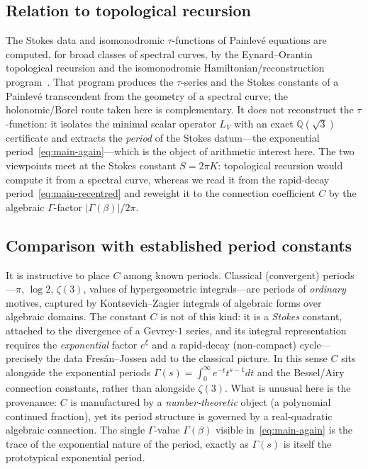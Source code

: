 \documentclass[11pt,reqno]{amsart}
\renewcommand{\_}{\vquadorigunderscore\allowbreak}
\theoremstyle{plain}
\theoremstyle{definition}
\newcommand{\LV}{L_{V}}
\newcommand{\Qsqrt}{\mathbb{Q}(\sqrt3)}
\providecommand{\C}{}\renewcommand{\C}{C}
\begin{document}
\subsection{Relation to topological recursion}
The Stokes data and isomonodromic $\tau$-functions of Painlev\'e equations are computed, for broad
classes of spectral curves, by the Eynard--Orantin topological recursion and the isomonodromic
Hamiltonian/reconstruction program~\cite{MarchalOrantin,IwakiMarchalSaenz,MarchalAlameddine}. That
program produces the $\tau$-series and the Stokes constants of a Painlev\'e transcendent from the
geometry of a spectral curve; the holonomic/Borel route taken here is complementary. It does not
reconstruct the $\tau$-function: it isolates the minimal scalar operator $\LV$ with an exact
$\Qsqrt$ certificate and extracts the \emph{period} of the Stokes datum---the exponential
period~\eqref{eq:main-again}---which is the object of arithmetic interest here. The two viewpoints
meet at the Stokes constant $S=2\pi K$: topological recursion would compute it from a spectral
curve, whereas we read it from the rapid-decay period~\eqref{eq:main-recentred} and reweight it to
the connection coefficient $\C$ by the algebraic $\Gamma$-factor $\lvert\Gamma(\beta)\rvert/2\pi$.

\subsection{Comparison with established period constants}
It is instructive to place $\C$ among known periods. Classical (convergent) periods---$\pi$,
$\log2$, $\zeta(3)$, values of hypergeometric integrals---are periods of \emph{ordinary} motives,
captured by Kontsevich--Zagier integrals of algebraic forms over algebraic domains. The constant
$\C$ is not of this kind: it is a \emph{Stokes} constant, attached to the divergence of a
Gevrey-$1$ series, and its integral representation requires the \emph{exponential} factor $e^{\xi}$
and a rapid-decay (non-compact) cycle---precisely the data Fres\'an--Jossen add to the classical
picture. In this sense $\C$ sits alongside the exponential periods $\Gamma(s)=\int_0^\infty
e^{-t}t^{s-1}dt$ and the Bessel/Airy connection constants, rather than alongside $\zeta(3)$. What
is unusual here is the provenance: $\C$ is manufactured by a \emph{number-theoretic} object (a
polynomial continued fraction), yet its period structure is governed by a real-quadratic
algebraic connection. The single $\Gamma$-value $\Gamma(\beta)$ visible
in~\eqref{eq:main-again} is the trace of the exponential nature of the period, exactly as
$\Gamma(s)$ is itself the prototypical exponential period.
\end{document}

